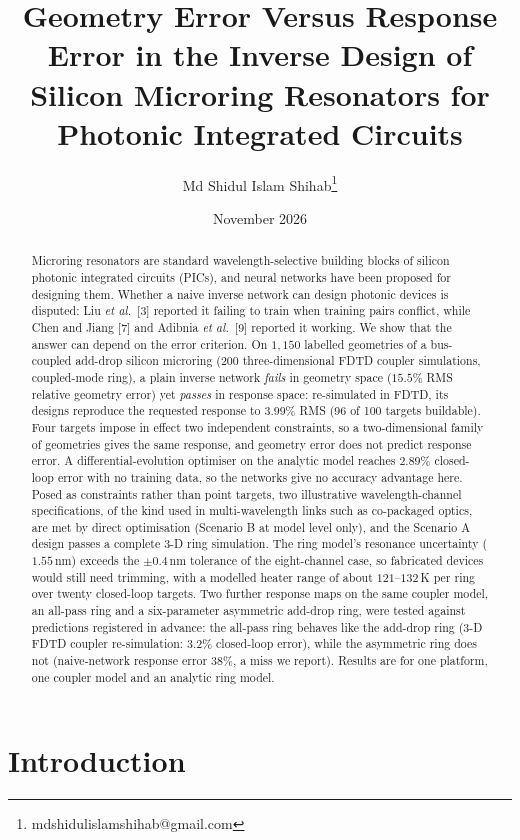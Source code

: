 \documentclass[11pt]{article}
\title{\bfseries Geometry Error Versus Response Error in the Inverse Design of Silicon Microring Resonators for Photonic Integrated Circuits}
\author[1]{Md Shidul Islam Shihab\thanks{mdshidulislamshihab@gmail.com}}
\affil[1]{Department of Electronics \& Communication Engineering,
Khulna University of Engineering \& Technology (KUET), Khulna, Bangladesh}
\date{November 2026}
\begin{document}
\maketitle

\begin{abstract}
\noindent Microring resonators are standard wavelength-selective building blocks of silicon photonic integrated circuits (PICs), and neural networks have been proposed for designing them. Whether a naive inverse network can design photonic devices is disputed: Liu
\emph{et al.}\ [3] reported it failing to train when training pairs conflict, while
Chen and Jiang [7] and Adibnia \emph{et al.}\ [9] reported it working. We show
that the answer can depend on the error criterion. On $1{,}150$ labelled geometries
of a bus-coupled add-drop silicon microring (200 three-dimensional FDTD coupler
simulations, coupled-mode ring), a plain inverse network \emph{fails} in geometry
space ($15.5\%$ RMS relative geometry error) yet \emph{passes} in response space:
re-simulated in FDTD, its designs reproduce the requested response to $3.99\%$ RMS (96 of 100 targets buildable).
Four targets impose in effect two independent constraints, so a two-dimensional
family of geometries gives the same response, and geometry error does not predict
response error. A differential-evolution optimiser on the analytic model reaches
$2.89\%$ closed-loop error with no training data, so the networks give no accuracy
advantage here. Posed as constraints rather than point targets, two illustrative wavelength-channel specifications, of the kind used in multi-wavelength links such as co-packaged optics, are met by direct optimisation (Scenario B at model level only), and the Scenario A design passes a complete 3-D ring simulation. The ring
model's resonance uncertainty ($1.55$\,nm) exceeds the $\pm0.4$\,nm tolerance of the eight-channel case, so fabricated devices would still need trimming, with a modelled heater range of about $121$--$132$\,K per ring over twenty closed-loop targets. Two further response maps on the same coupler model, an all-pass ring and a six-parameter asymmetric add-drop ring, were tested against predictions registered in advance: the all-pass ring behaves like the add-drop ring (3-D FDTD coupler re-simulation: $3.2\%$ closed-loop error), while the asymmetric ring does not (naive-network response error $38\%$, a miss we report). Results are for one platform, one coupler model and an analytic ring model.
\end{abstract}

\section{Introduction}
\end{document}
